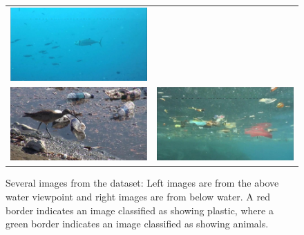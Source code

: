 \begin{figure}[h!tb]
{\begin{tabular}{rl}
%
\colorbox{green!80}{
\includegraphics[keepaspectratio=true,width=\iwith]{images/matrix/5053_10.jpg}}\\
%
\colorbox{red!70}{\colorbox{green!80}{
\includegraphics[keepaspectratio=true,width=\iwith]{images/matrix/701_11.jpg}}}&
%
\colorbox{red!70}{
\includegraphics[keepaspectratio=true,width=\iwith]{images/matrix/6_01.jpg}}
\end{tabular}}
\fi
\caption{Several images from the dataset: Left images are from the above water viewpoint and right images are from below water. A red border indicates an image classified as showing plastic, where a green border indicates an image classified as showing animals.}
\label{fig:datasetimages}
\end{figure}